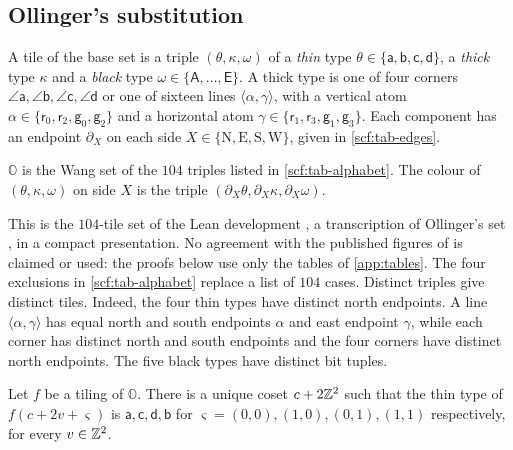 \subsection{Ollinger's substitution}\label{scf:sub-base}

A tile of the base set is a triple $(\theta,\kappa,\omega)$ of a \emph{thin} type $\theta\in\{\mathsf a,\mathsf b,\mathsf c,\mathsf d\}$, a \emph{thick} type $\kappa$ and a \emph{black} type $\omega\in\{\mathsf A,\dots,\mathsf E\}$. A thick type is one of four corners $\angle\mathsf a,\angle\mathsf b,\angle\mathsf c,\angle\mathsf d$ or one of sixteen lines $\langle\alpha,\gamma\rangle$, with a vertical atom $\alpha\in\{\mathsf r_0,\mathsf r_2,\mathsf g_0,\mathsf g_2\}$ and a horizontal atom $\gamma\in\{\mathsf r_1,\mathsf r_3,\mathsf g_1,\mathsf g_3\}$. Each component has an endpoint $\partial_X$ on each side $X\in\{\mathrm N,\mathrm E,\mathrm S,\mathrm W\}$, given in \cref{scf:tab-edges}.

\begin{definition}\label{scf:def-base}
$\mathbb O$ is the Wang set of the $104$ triples listed in \cref{scf:tab-alphabet}. The colour of $(\theta,\kappa,\omega)$ on side $X$ is the triple $(\partial_X\theta,\partial_X\kappa,\partial_X\omega)$.
\end{definition}

This is the $104$-tile set of the Lean development \cite{LeanWang}, a transcription of Ollinger's set \cite{Ollinger08}, in a compact presentation. No agreement with the published figures of \cite{Ollinger08} is claimed or used: the proofs below use only the tables of \cref{app:tables}. The four exclusions in \cref{scf:tab-alphabet} replace a list of $104$ cases. Distinct triples give distinct tiles. Indeed, the four thin types have distinct north endpoints. A line $\langle\alpha,\gamma\rangle$ has equal north and south endpoints $\alpha$ and east endpoint $\gamma$, while each corner has distinct north and south endpoints and the four corners have distinct north endpoints. The five black types have distinct bit tuples.

\begin{lemma}\label{scf:thin}
Let $f$ be a tiling of $\mathbb O$. There is a unique coset $c+2\mathbb{Z}^2$ such that the thin type of $f(c+2v+\varsigma)$ is $\mathsf a,\mathsf c,\mathsf d,\mathsf b$ for $\varsigma=(0,0),(1,0),(0,1),(1,1)$ respectively, for every $v\in\mathbb{Z}^2$.
\end{lemma}

